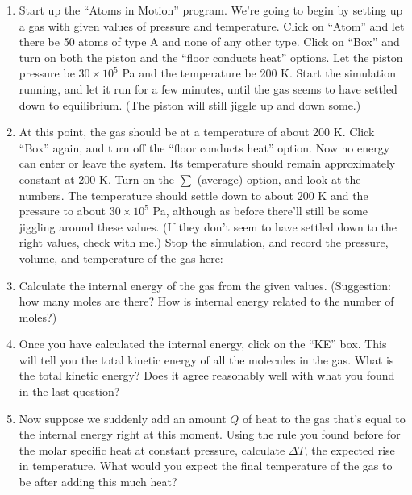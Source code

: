 \documentclass{article}
\begin{document}
\begin{enumerate}

\item Start up the ``Atoms in Motion'' program.  We're going to begin
by setting up a gas with given values of pressure and temperature.
Click on ``Atom''
and let there be 50 atoms of type A and none of any other type.
Click on ``Box'' and turn on both the piston and the ``floor conducts
heat'' options.  Let the piston pressure be $30\times 10^5$ Pa and
the temperature be 200 K.  Start the simulation running, and let it
run for a few minutes, until the gas seems to have settled down
to equilibrium.  (The piston will still jiggle up and down some.)

\item At this point, the gas should be at a temperature of about 200 K.
Click ``Box'' again, and turn off the ``floor conducts heat'' option.
Now no energy can enter or leave the system.  Its temperature should remain
approximately constant at 200 K.  Turn on the $\sum$ (average) option,
and look at the numbers.  The temperature should settle down to about 200 K
and the pressure to about $30\times 10^5$ Pa,
although as before there'll still be some jiggling around these values.  
(If they don't seem to have settled down to the right values, check with me.)
Stop the simulation, and 
record the pressure, volume, and temperature of the gas here:

\vskip 1in


\item Calculate the internal energy of the gas from the given values.  
(Suggestion: how many moles are there?  How is internal energy related
to the number of moles?)


\vskip 1.5in



\item Once you have calculated the internal energy, click on the ``KE''
box.  This will tell you the total kinetic energy of all the molecules
in the gas.  What is the total kinetic energy?  
Does it agree reasonably well with what you found in the last question?
\label{ke}



\vskip 1in

\item Now suppose we suddenly add an amount $Q$ of heat to the gas that's
equal to the internal energy right at this moment.  Using the rule you
found before for the molar specific heat at constant pressure, calculate
$\Delta T$, the expected rise in temperature.  What would you expect the
final temperature of the gas to be after adding this much heat?




\end{enumerate}
\end{document}
